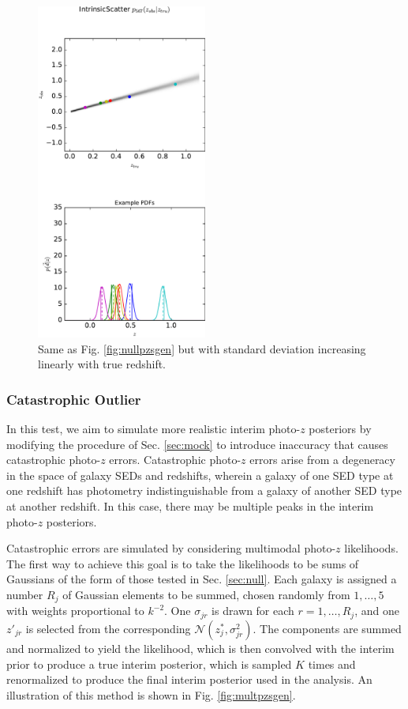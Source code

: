 \documentclass[preprint]{aastex}
\begin{document}
\begin{figure}
\includegraphics[width=0.5\textwidth]{figs/vars/zobsvztru.pdf}
\caption{Same as Fig. \ref{fig:nullpzsgen} but with standard deviation 
increasing linearly with true redshift.}
\label{fig:varspzs}
\end{figure}

\subsubsection{Catastrophic Outlier}
\label{sec:inaccuracy}

In this test, we aim to simulate more realistic interim photo-$z$ posteriors by 
modifying the procedure of Sec. \ref{sec:mock} to introduce inaccuracy that 
causes catastrophic photo-$z$ errors.  Catastrophic photo-$z$ errors arise from 
a degeneracy in the space of galaxy SEDs and redshifts, wherein a galaxy of one 
SED type at one redshift has photometry indistinguishable from a galaxy of 
another SED type at another redshift.  In this case, there may be multiple 
peaks in the interim photo-$z$ posteriors.  

Catastrophic errors are simulated by considering multimodal photo-$z$ 
likelihoods.  The first way to achieve this goal is to take the likelihoods to 
be sums of Gaussians of the form of those tested in Sec. \ref{sec:null}.  Each 
galaxy is assigned a number $R_{j}$ of Gaussian elements to be summed, chosen 
randomly from $1,\dots,5$ with weights proportional to $k^{-2}$.  One 
$\sigma_{jr}$ is drawn for each $r=1,\dots,R_{j}$, and one $z'_{jr}$ is 
selected from the corresponding $\mathcal{N}(z^{*}_{j},\sigma^{2}_{jr})$.  The 
components are summed and normalized to yield the likelihood, which is then 
convolved with the interim prior to produce a true interim posterior, which is 
sampled $K$ times and renormalized to produce the final interim posterior used 
in the analysis.   An illustration of this method is shown in Fig. 
\ref{fig:multpzsgen}. 
\end{document}
